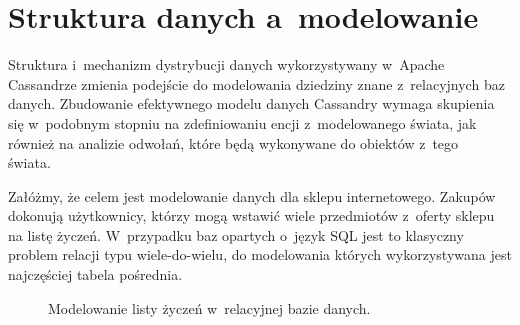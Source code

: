 \section{Struktura danych a~modelowanie}
\label{sec:relative_vs_cassandra_model}

Struktura i~mechanizm dystrybucji danych wykorzystywany w~Apache Cassandrze zmienia podejście do modelowania dziedziny znane z~relacyjnych baz danych. Zbudowanie efektywnego modelu danych Cassandry wymaga skupienia się w~podobnym stopniu na zdefiniowaniu encji z~modelowanego świata, jak również na analizie odwołań, które będą wykonywane do obiektów z~tego świata.~\cite{modeling_best_practices_pt_1}

Załóżmy, że celem jest modelowanie danych dla sklepu internetowego. Zakupów dokonują użytkownicy, którzy mogą wstawić wiele przedmiotów z~oferty sklepu na listę życzeń. W~przypadku baz opartych o~język SQL jest to klasyczny problem relacji typu wiele-do-wielu, do modelowania których wykorzystywana jest najczęściej tabela pośrednia. 

\begin{figure}[ht!]
	\centering

	\caption{Modelowanie listy życzeń w~relacyjnej bazie danych.}
	\label{fig:er_wishlist}
\end{figure}


